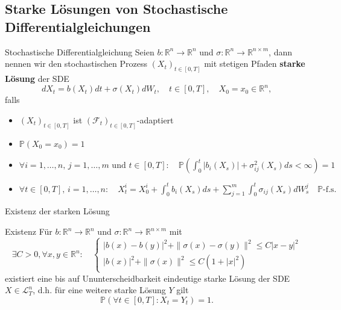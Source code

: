\documentclass[11pt,aspectratio=169]{beamer}
\begin{document}
\subsection{Starke Lösungen von Stochastische Differentialgleichungen}

\begin{frame}{Stochastische Differentialgleichung}
Seien $b: \mathbb{R}^n \to \mathbb{R}^n$ und $\sigma: \mathbb{R}^n \to \mathbb{R}^{n \times m}$, dann nennen wir den stochastischen Prozess $(X_t)_{t \in [0,T]}$ mit stetigen Pfaden \textbf{starke Lösung} der SDE 
\[
d X_t = b(X_t) dt + \sigma(X_t) dW_t, \quad t \in [0,T], \quad X_0 = x_0 \in \mathbb{R}^n,
\]
falls \\

\begin{minipage}[c]{0.30\linewidth}{\tiny
  \begin{itemize}
    \item $(X_t)_{t \in [0,T]}$ ist $(\mathcal{F}_t)_{t \in [0,T]}$-adaptiert
    \item $\mathbb{P}(X_0 = x_0) = 1$
  \end{itemize}}
\end{minipage}\hfill
\begin{minipage}[c]{0.70\linewidth}{\tiny
\begin{itemize}
  \item $
        \forall i=1,\dots,n, \, j=1,\dots,m \text{ und } t \in [0,T]: \quad \mathbb{P}\left(\int_0^t |b_i(X_s)| + \sigma_{ij}^2(X_s) ds < \infty\right)=1
        $
        \item 
        $
        \forall t \in [0,T], \, i=1,\dots,n: \quad X_t^{i} = X_0^{i} + \int_0^t b_i(X_s) ds + \sum_{j=1}^m \int_0^t \sigma_{ij}(X_s) dW_s^j \quad \mathbb{P}\text{-f.s.}
        $
\end{itemize}
}
\end{minipage}
\end{frame}

\begin{frame}{Existenz der starken Lösung}

  \begin{block}{Existenz}
    Für $b : \mathbb{R}^n \to \mathbb{R}^n$ und $\sigma: \mathbb{R}^n \to \mathbb{R}^{n\times m}$ mit  
    \[
    \exists C>0, \forall x,y \in \mathbb{R}^n: \quad 
    \begin{cases}
      |b(x)-b(y)|^2 + \|\sigma(x) - \sigma(y)\|^2 \leq C |x-y|^2 \\ 
      |b(x)|^2 + \|\sigma(x)\|^2 \leq C(1+|x|^2)
    \end{cases}
    \]
    existiert eine bis auf Ununterscheidbarkeit eindeutige starke Lösung der SDE $X \in \mathcal{L}_T^n$, d.h. für eine weitere starke Lösung $Y$ gilt 
    \[
    \mathbb{P} (\forall t \in [0,T]: X_t = Y_t) = 1.
    \]
  \end{block}
\end{frame}
\end{document}
